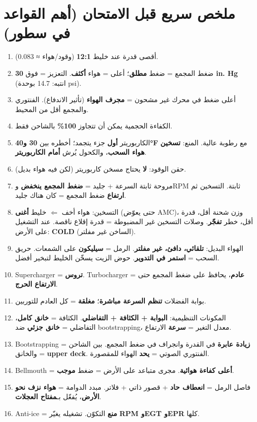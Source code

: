 \documentclass[11pt,a4paper]{article}
\newcommand{\en}[1]{\textenglish{#1}}
\begin{document}
\section{ملخص سريع قبل الامتحان (أهم القواعد في سطور)}
\begin{enumerate}[label=\arabic*.]
  \item أقصى قدرة عند خليط \textbf{12:1} (وقود/هواء ≈ 0.083).
  \item ضغط المجمع = ضغط \textbf{مطلق}؛ أعلى = هواء \textbf{أكثف}. التعزيز = فوق \textbf{30 \en{in. Hg}} (انتبه: 14.7 بوحدة \en{psi}).
  \item أعلى ضغط في محرك غير مشحون = \textbf{مجرف الهواء} (تأثير الاندفاع). الفنتوري والمجمع أقل من المحيط.
  \item الكفاءة الحجمية يمكن أن تتجاوز \textbf{100\%} بالشاحن فقط.
  \item الكاربوريتر \textbf{أول} جزء يتجمد؛ أخطره بين \textbf{30 و40°F} مع رطوبة عالية. المنع: \textbf{تسخين هواء السحب}، والكحول يُرش \textbf{أمام الكاربوريتر}.
  \item حقن الوقود: \textbf{لا} يحتاج مسخن كاربوريتر (لكن فيه هواء بديل).
  \item مروحة ثابتة السرعة + جليد = \textbf{ضغط المجمع ينخفض} و\en{RPM} ثابتة. التسخين ثم \textbf{ارتفاع} ضغط المجمع = كان هناك جليد.
  \item التسخين: هواء أخف $\Leftarrow$ خليط \textbf{أغنى} (حتى يعوّض \en{AMC})، وزن شحنة أقل، قدرة أقل، خطر \textbf{تفجّر}. وصلات التسخين غير المضبوطة = قدرة إقلاع ناقصة. عند التشغيل على الأرض: \textbf{\en{COLD}} (الساخن غير مفلتر).
  \item الهواء البديل: \textbf{تلقائي، دافئ، غير مفلتر}. الرمل = \textbf{سيليكون} على الشمعات. حريق السحب = \textbf{استمر في التدوير}. حوض الزيت يسخّن الخليط لتبخير أفضل.
  \item \en{Supercharger} = \textbf{تروس}. \en{Turbocharger} = \textbf{عادم}، يحافظ على ضغط المجمع حتى \textbf{الارتفاع الحرج}.
  \item بوابة الفضلات \textbf{تنظم السرعة مباشرة}؛ \textbf{مغلقة} = كل العادم للتوربين.
  \item المكونات التنظيمية: \textbf{البوابة + الكثافة + التفاضلي}. الكثافة = \textbf{خانق كامل}، التفاضلي = \textbf{خانق جزئي} ضد \en{bootstrapping}، معدل التغير = \textbf{سرعة} الارتفاع.
  \item \en{Bootstrapping} = \textbf{زيادة عابرة} في القدرة وانجراف في ضغط المجمع. بين الشاحن والخانق = \textbf{\en{upper deck}}. الفنتوري الصوتي = \textbf{يحد} الهواء للمقصورة.
  \item \en{Bellmouth} = \textbf{أعلى كفاءة هوائية}. مجرى متباعد على الأرض = ضغط \textbf{موجب}.
  \item فاصل الرمل = \textbf{انعطاف حاد} + قصور ذاتي + فلاتر. مبدد الدوامة = \textbf{هواء نزف نحو الأرض}، يُفعّل بـ\textbf{مفتاح العجلات}.
  \item \en{Anti-ice} = \textbf{منع} التكوّن. تشغيله يغيّر \textbf{\en{RPM} و\en{EGT} و\en{EPR}} كلها.
\end{enumerate}
\end{document}
